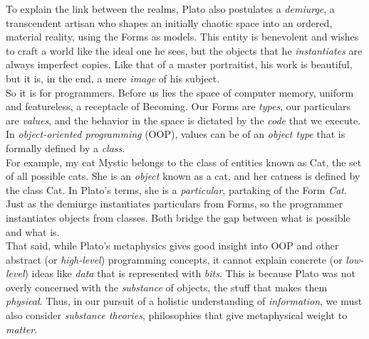To explain the link between the realms, Plato also postulates a \textit{demiurge}, a transcendent artisan who shapes an initially chaotic space into an ordered, material reality, using the Forms as models. This entity is benevolent and wishes to craft a world like the ideal one he sees, but the objects that he \textit{instantiates} are always imperfect copies. Like that of a master portraitist, his work is beautiful, but it is, in the end, a mere \textit{image} of his subject. \\

So it is for programmers. Before us lies the space of computer memory, uniform and featureless, a receptacle of Becoming. Our Forms are \textit{types}, our particulars are \textit{values}, and the behavior in the space is dictated by the \textit{code} that we execute. In \textit{object-oriented programming} (OOP), values can be of an \textit{object type} that is formally defined by a \textit{class}. \\

For example, my cat Mystic belongs to the class of entities known as Cat, the set of all possible cats. She is an \textit{object} known as a cat, and her catness is defined by the class Cat. In Plato's terms, she is a \textit{particular}, partaking of the Form \textit{Cat}. Just as the demiurge instantiates particulars from Forms, so the programmer instantiates objects from classes. Both bridge the gap between what is possible and what is. \\

That said, while Plato's metaphysics gives good insight into OOP and other abstract (or \textit{high-level}) programming concepts, it cannot explain concrete (or \textit{low-level}) ideas like \textit{data} that is represented with \textit{bits}. This is because Plato was not overly concerned with the \textit{substance} of objects, the stuff that makes them \textit{physical}. Thus, in our pursuit of a holistic understanding of \textit{information}, we must also consider \textit{substance theories}, philosophies that give metaphysical weight to \textit{matter}. \\


